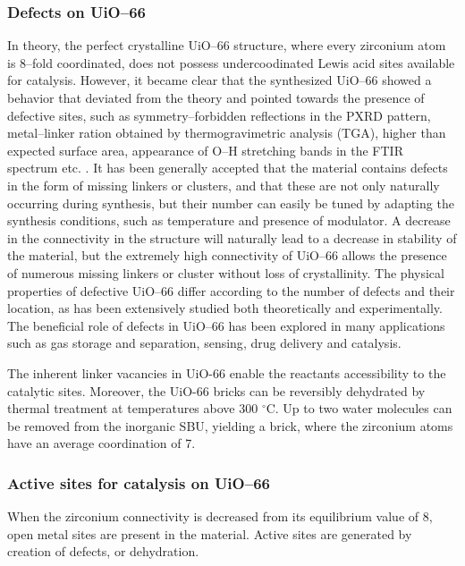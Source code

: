 \subsubsection*{Defects on UiO--66}
In theory, the perfect crystalline UiO--66 structure, where every zirconium atom is 8--fold coordinated, does not possess undercoodinated Lewis acid sites available for catalysis. However, it became clear that the synthesized UiO--66 showed a behavior that deviated from the theory and pointed towards the presence of defective sites, such as symmetry--forbidden reflections in the PXRD pattern, metal--linker ration obtained by thermogravimetric analysis (TGA), higher than expected surface area, appearance of O--H stretching bands in the FTIR spectrum etc. \cite{shearer2014tuned, valenzano2011disclosing}. It has been generally accepted that the material contains defects in the form of missing linkers or clusters, and that these are not only naturally occurring during synthesis, but their number can easily be tuned by adapting the synthesis conditions, such as temperature and presence of modulator\cite{wu2013unusual, shearer2016defect}. A decrease in the connectivity in the structure will naturally lead to a decrease in stability of the material, but the extremely high connectivity of UiO--66 allows the presence of numerous missing linkers or cluster without loss of crystallinity. The physical properties of defective UiO--66 differ according to the number of defects and their location, as has been extensively studied both theoretically and experimentally. The beneficial role of defects in UiO--66 has been explored in many applications such as gas storage and separation\cite{wu2013unusual, ren2014modulated}, sensing\cite{stassen2016towards}, drug delivery\cite{cunha2013rationale} and catalysis\cite{vermoortele2013synthesis, rogge2017metal}. 

The inherent linker vacancies in UiO-66 enable the reactants accessibility to the catalytic sites. 
Moreover, the UiO-66 bricks can be reversibly dehydrated by thermal treatment at temperatures above 300 $^{\circ}$C. Up to two water molecules can be removed from the inorganic  SBU, yielding a  brick, where the zirconium atoms have an average coordination of 7. 

\subsubsection*{Active sites for catalysis on UiO--66}
When the zirconium connectivity is decreased from its equilibrium value of 8, open metal sites are present in the material. Active sites are generated by creation of defects, or dehydration.

